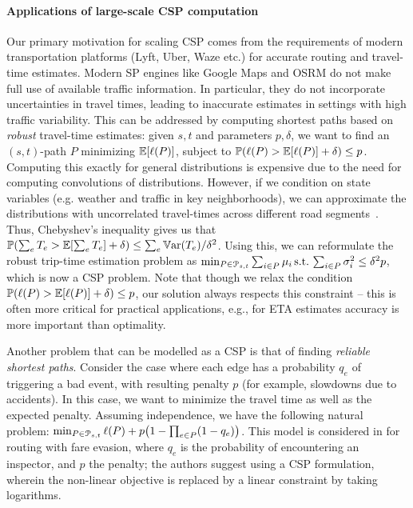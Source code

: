\paragraph{Applications of large-scale CSP computation}
Our primary motivation for scaling CSP comes from the requirements of modern transportation platforms (Lyft, Uber, Waze etc.) for accurate routing and travel-time estimates.
Modern SP engines like Google Maps and OSRM do not make full use of available traffic information.
In particular, they do not incorporate uncertainties in travel times, leading to inaccurate estimates in settings with high traffic variability.
This can be addressed by computing shortest paths based on \emph{robust} travel-time estimates:
given $s,t$ and parameters $p,\delta$, we want to find an $(s,t)$-path $P$ minimizing $\mathbb{E}[\ell(P)]$, subject to $\mathbb{P}(\ell(P)>\mathbb{E}[\ell(P)]+\delta)\leq p$.
Computing this exactly for general distributions is expensive due to the need for computing convolutions of distributions. 
However, if we condition on state variables (e.g. weather and traffic in key neighborhoods),  we can approximate the distributions with uncorrelated travel-times across different road segments~\cite{woodard2017predicting}. 
Thus, Chebyshev's inequality gives us that $\mathbb{P}(\sum_eT_e>\mathbb{E}[\sum_eT_e]+\delta)\leq \sum_e\mathbb{V}\textnormal{ar}(T_e)/\delta^2$. Using this, we can reformulate the robust trip-time estimation problem as 
$\min_{ P\in\mathcal{P}_{s,t}}\sum_{i\in P}\mu_i \, \mbox{s.t.}\, \sum_{i\in P}\sigma^2_i\leq \delta^2p$, which is now a CSP problem. 
Note that though we relax the condition $\mathbb{P}(\ell(P)>\mathbb{E}[\ell(P)]+\delta)\leq p$, our solution always respects this constraint -- this is often more critical for practical applications, e.g., for ETA estimates accuracy is more important than optimality.

Another problem that can be modelled as a CSP is that of finding \emph{reliable shortest paths}.
Consider the case where each edge has a probability $q_e$ of triggering a bad event, with resulting penalty $p$ (for example, slowdowns due to accidents).
In this case, we want to minimize the travel time as well as the expected penalty.
Assuming independence, we have the following natural problem:
$\min_{P\in\Pst} \ell(P)+p\prn*{1-\prod_{e\in P}(1-q_e)}$.
This model is considered in \cite{fareevasion} for routing with fare evasion, where $q_e$ is the probability of encountering an inspector, and $p$ the penalty; the authors suggest using a CSP formulation, wherein the non-linear objective is replaced by a linear constraint by taking logarithms.


